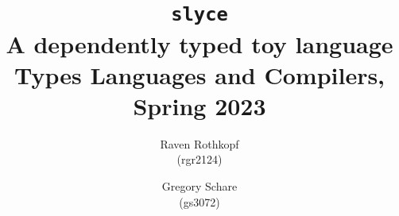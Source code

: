 \documentclass[12pt]{article}
\begin{document}
\title{\texttt{slyce}\\
    \normalsize A dependently typed toy language \\
    Types Languages and Compilers, Spring 2023}

\author{Raven Rothkopf\\ \small (rgr2124)
    \and 
    Gregory Schare\\ \small (gs3072)}

\maketitle
\tableofcontents\newpage



\end{document}
